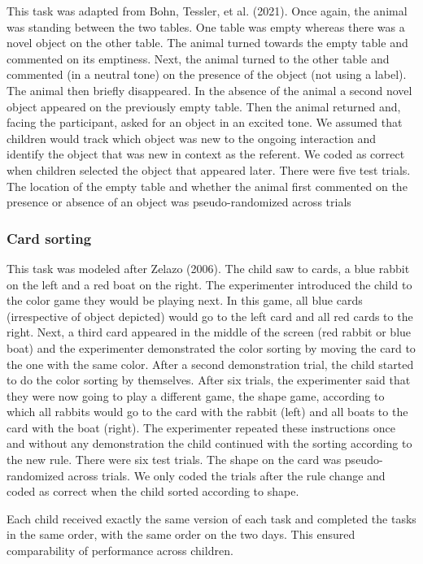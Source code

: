 \documentclass[
  man,floatsintext]{apa6}
\begin{document}
This task was adapted from Bohn, Tessler, et al. (2021). Once again, the animal was standing between the two tables. One table was empty whereas there was a novel object on the other table. The animal turned towards the empty table and commented on its emptiness. Next, the animal turned to the other table and commented (in a neutral tone) on the presence of the object (not using a label). The animal then briefly disappeared. In the absence of the animal a second novel object appeared on the previously empty table. Then the animal returned and, facing the participant, asked for an object in an excited tone. We assumed that children would track which object was new to the ongoing interaction and identify the object that was new in context as the referent. We coded as correct when children selected the object that appeared later. There were five test trials. The location of the empty table and whether the animal first commented on the presence or absence of an object was pseudo-randomized across trials

\hypertarget{card-sorting}{%
\subsubsection{Card sorting}\label{card-sorting}}

This task was modeled after Zelazo (2006). The child saw to cards, a blue rabbit on the left and a red boat on the right. The experimenter introduced the child to the color game they would be playing next. In this game, all blue cards (irrespective of object depicted) would go to the left card and all red cards to the right. Next, a third card appeared in the middle of the screen (red rabbit or blue boat) and the experimenter demonstrated the color sorting by moving the card to the one with the same color. After a second demonstration trial, the child started to do the color sorting by themselves. After six trials, the experimenter said that they were now going to play a different game, the shape game, according to which all rabbits would go to the card with the rabbit (left) and all boats to the card with the boat (right). The experimenter repeated these instructions once and without any demonstration the child continued with the sorting according to the new rule. There were six test trials. The shape on the card was pseudo-randomized across trials. We only coded the trials after the rule change and coded as correct when the child sorted according to shape.

Each child received exactly the same version of each task and completed the tasks in the same order, with the same order on the two days. This ensured comparability of performance across children.
\end{document}
